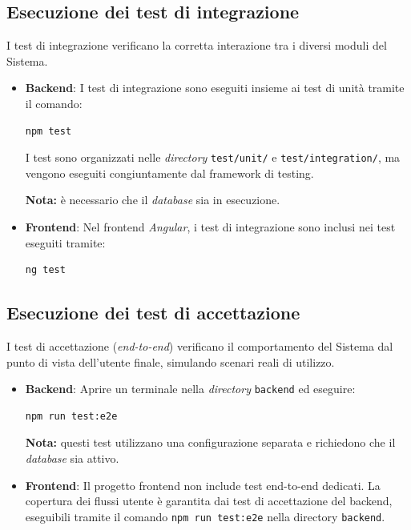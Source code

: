 \documentclass[10pt, letterpaper]{article}
\begin{document}
\subsection{Esecuzione dei test di integrazione}

I test di integrazione verificano la corretta interazione tra i diversi moduli del Sistema.

\begin{itemize}
      \item \textbf{Backend}: I test di integrazione sono eseguiti insieme ai test di unità tramite il comando:
      \begin{verbatim}npm test\end{verbatim}
      I test sono organizzati nelle \textit{directory} \texttt{test/unit/} e \texttt{test/integration/}, ma vengono eseguiti congiuntamente dal framework di testing.
      
      \textbf{Nota:} è necessario che il \textit{database} sia in esecuzione.
      \item \textbf{Frontend}: Nel frontend \textit{Angular}, i test di integrazione sono inclusi nei test eseguiti tramite:
      \begin{verbatim}ng test\end{verbatim}
\end{itemize}



\subsection{Esecuzione dei test di accettazione}

I test di accettazione (\textit{end-to-end}) verificano il comportamento del Sistema dal punto di vista dell'utente finale, simulando scenari reali di utilizzo.

\begin{itemize}
      \item \textbf{Backend}: Aprire un terminale nella \textit{directory} \texttt{backend} ed eseguire:
      \begin{verbatim}npm run test:e2e\end{verbatim}

      \textbf{Nota:} questi test utilizzano una configurazione separata e richiedono che il \textit{database} sia attivo.
      \item  \textbf{Frontend}: Il progetto frontend non include test end-to-end dedicati.
      La copertura dei flussi utente è garantita dai test di accettazione del backend, eseguibili tramite il comando \texttt{npm run test:e2e} nella directory \texttt{backend}.
\end{itemize}
\end{document}
